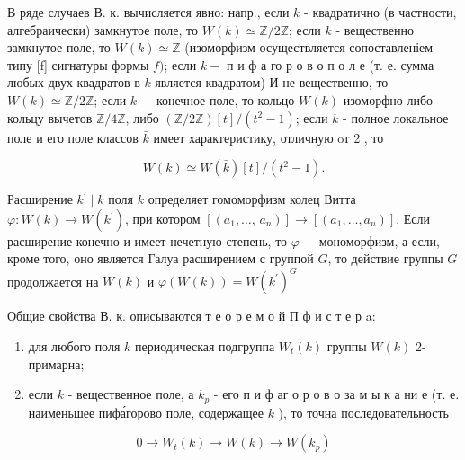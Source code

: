 \documentclass[10pt]{article}
\begin{document}
В ряде случаев В. к. вычисляется явно: напр., если $k$ - квадратично (в частности, алгебраически) замкнутое поле, то $W(k) \simeq \mathbb{Z} / 2 \mathbb{Z}$; если $k$ - вещественно замкнутое поле, то $W(k) \simeq \mathbb{Z}$ (изоморфизм осуществляется сопоставленіем типу [f] сигнатуры формы $f)$; если $k-$ п и ф а го р о в о п о л е (т. е. сумма любых двух квадратов в $k$ является квадратом) И не вещественно, то $W(k) \simeq \mathbb{Z} / 2 \mathbb{Z}$; если $k-$ конечное поле, то кольцо $W(k)$ изоморфно либо кольцу вычетов $\mathbb{Z} / 4 \mathbb{Z}$, либо $(\mathbb{Z} / 2 \mathbb{Z})[t] /\left(t^{2}-1\right)$; если $k$ - полное локальное поле и его поле классов $\bar{k}$ имеет характеристику, отличную oт 2 , то



\[

W(k) \simeq W(\bar{k})[t] /\left(t^{2}-1\right) .

\]



Расширение $k^{\prime} \mid k$ поля $k$ определяет гомоморфизм колец Витта $\varphi: W(k) \rightarrow W\left(k^{\prime}\right)$, при котором $\left[\left(a_{1}, \ldots\right.\right.$, $\left.\left.a_{n}\right)\right] \rightarrow\left[\left(a_{1}, \ldots, a_{n}\right)\right]$. Если расширение конечно и имеет нечетную степень, то $\varphi-$ мономорфизм, а если, кроме того, оно является Галуа расширением с группой $G$, то действие группы $G$ продолжается на $W(k)$ и $\varphi(W(k))=W\left(k^{\prime}\right)^{G}$



Общие свойства В. к. описываются т е о р е м о й П ф и с т е р a:



\begin{enumerate}

  \item для любого поля $k$ периодическая подгруппа $W_{t}(k)$ группы $W(k)$ 2-примарна;



  \item если $k$ - вещественное поле, а $k_{p}$ - его п и ф аг о р о в о за м ы к а ни е (т. е. наименьшее пифа́горово поле, содержащее $k$ ), то точна последовательность



\end{enumerate}



\[

0 \longrightarrow W_{t}(k) \longrightarrow W(k) \longrightarrow W\left(k_{p}\right)

\]
\end{document}
